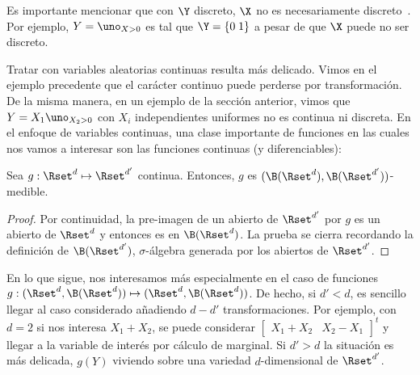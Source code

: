 Es  importante  mencionar que  con  $\Y$  discreto,  $\X$ no  es  necesariamente
discreto~\cite{AthLah06}. Por ejemplo, $Y = \uno_{X>0}$  es tal que $\Y = \{ 0 \;
1 \}$ a pesar de que $\X$ puede no ser discreto.

Tratar con  variables aleatorias continuas  resulta m\'as delicado. Vimos  en el
ejemplo   precedente   que   el   car\'acter   continuo   puede   perderse   por
transformaci\'on. De  la misma manera, en  un ejemplo de  la secci\'on anterior,
vimos  que  $Y =  X_1  \uno_{X_2>0}$ con  $X_i$  independientes  uniformes no  es
continua  ni  discreta.   En  el  enfoque  de  variables  continuas,  una  clase
importante de  funciones en las cuales  nos vamos a interesar  son las funciones
continuas (y diferenciables):
%
\begin{lema}
\label{Lem:MP:ContinuidadCaracterMedible}
%
  Sea   $g:   \Rset^d   \mapsto   \Rset^{d'}$   continua.   Entonces,   $g$   es
  $(\B(\Rset^d),\B(\Rset^{d'}))$-medible.
\end{lema}
%
\begin{proof}
  Por continuidad,  la pre-imagen de  un abierto de  $\Rset^{d'}$ por $g$  es un
  abierto  de $\Rset^d$  y entonces  es en  $\B(\Rset^d)$. La  prueba  se cierra
  recordando  la definici\'on  de $\B(\Rset^{d'})$,  $\sigma$-\'algebra generada
  por los abiertos de $\Rset^{d'}$.
\end{proof}

En lo que sigue, nos interesamos m\'as especialmente en el caso de funciones $g:
(\Rset^d ,  \B(\Rset^d)) \mapsto (\Rset^d ,  \B(\Rset^d))$.  De hecho,  si $d' <
d$,   es    sencillo   llegar    al   caso   considerado    a\~nadiendo   $d-d'$
transformaciones. Por ejemplo, con $d = 2$ si nos interesa $X_1 + X_2$, se puede
considerar $\begin{bmatrix} X_1 + X_2 &  X_2 - X_1\end{bmatrix}^t$ y llegar a la
variable de inter\'es  por c\'alculo de marginal. Si $d' >  d$ la situaci\'on es
m\'as  delicada,   $g(Y)$  viviendo   sobre  una  variedad   $d$-dimensional  de
$\Rset^{d'}$.

